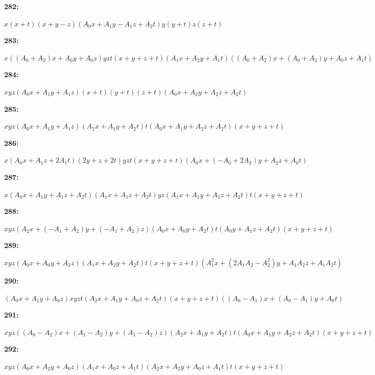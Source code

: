 \documentclass[12pt]{amsart}
\theoremstyle{plain}
\theoremstyle{remark}
\theoremstyle{definition}
\numberwithin{table}{section}
\begin{document}
\noindent\parbox[right]{9mm}{\textbf{282:}}\parbox{3mm}{\hfill}%
\parbox[t]{15cm}{\(x(x + t)(x + y - z)(A_{0}x + A_{1}y - A_{1}z + A_{2}t)y(y + t)z(z + t)\)}

\noindent\parbox[right]{9mm}{\textbf{283:}}\parbox{3mm}{\hfill}%
\parbox[t]{15cm}{\(x((A_{0} + A_{2})x + A_{0}y + A_{0}z)yzt(x + y + z + t)(A_{1}x + A_{2}y + A_{1}t)((A_{0} + A_{2})x + (A_{0} + A_{2})y + A_{0}z + A_{1}t)\)}

\noindent\parbox[right]{9mm}{\textbf{284:}}\parbox{3mm}{\hfill}%
\parbox[t]{15cm}{\(xyz(A_{0}x + A_{1}y + A_{1}z)(x + t)(y + t)(z + t)(A_{0}x + A_{2}y + A_{2}z + A_{2}t)\)}

\noindent\parbox[right]{9mm}{\textbf{285:}}\parbox{3mm}{\hfill}%
\parbox[t]{15cm}{\(xyz(A_{0}x + A_{1}y + A_{1}z)(A_{2}x + A_{1}y + A_{2}t)t(A_{0}x + A_{1}y + A_{2}z + A_{2}t)(x + y + z + t)\)}

\noindent\parbox[right]{9mm}{\textbf{286:}}\parbox{3mm}{\hfill}%
\parbox[t]{15cm}{\(x(A_{0}x + A_{1}z + 2A_{1}t)(2y + z + 2t)yzt(x + y + z + t)(A_{0}x + (-A_{0} + 2A_{2})y + A_{2}z + A_{0}t)\)}

\noindent\parbox[right]{9mm}{\textbf{287:}}\parbox{3mm}{\hfill}%
\parbox[t]{15cm}{\(x(A_{0}x + A_{1}y + A_{1}z + A_{2}t)(A_{1}x + A_{1}z + A_{2}t)yz(A_{1}x + A_{1}y + A_{3}z + A_{2}t)t(x + y + z + t)\)}

\noindent\parbox[right]{9mm}{\textbf{288:}}\parbox{3mm}{\hfill}%
\parbox[t]{15cm}{\(xyz(A_{2}x + (-A_{1} + A_{2})y + (-A_{1} + A_{2})z)(A_{0}x + A_{0}y + A_{2}t)t(A_{0}y + A_{1}z + A_{2}t)(x + y + z + t)\)}

\noindent\parbox[right]{9mm}{\textbf{289:}}\parbox{3mm}{\hfill}%
\parbox[t]{15cm}{\(xyz(A_{0}x + A_{0}y + A_{2}z)(A_{1}x + A_{2}y + A_{2}t)t(x + y + z + t)(A_{1}^2x + (2A_{1}A_{2} - A_{2}^2)y + A_{1}A_{2}z + A_{1}A_{2}t)\)}

\noindent\parbox[right]{9mm}{\textbf{290:}}\parbox{3mm}{\hfill}%
\parbox[t]{15cm}{\((A_{0}x + A_{1}y + A_{0}z)xyzt(A_{2}x + A_{1}y + A_{0}z + A_{2}t)(x + y + z + t)((A_{0} - A_{1})x + (A_{0} - A_{1})y + A_{0}t)\)}

\noindent\parbox[right]{9mm}{\textbf{291:}}\parbox{3mm}{\hfill}%
\parbox[t]{15cm}{\(xyz((A_{0} - A_{2})x + (A_{1} - A_{2})y + (A_{1} - A_{2})z)(A_{2}x + A_{1}y + A_{2}t)t(A_{0}x + A_{1}y + A_{2}z + A_{2}t)(x + y + z + t)\)}

\noindent\parbox[right]{9mm}{\textbf{292:}}\parbox{3mm}{\hfill}%
\parbox[t]{15cm}{\(xyz(A_{0}x + A_{2}y + A_{0}z)(A_{1}x + A_{0}z + A_{1}t)(A_{2}x + A_{2}y + A_{0}z + A_{1}t)t(x + y + z + t)\)}
\end{document}
